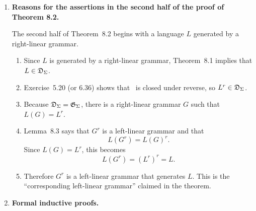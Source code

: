 \begin{enumerate}[{8.}1. ]
\begin{enumerate}
\item Proof by induction on $n$.

\textbf{Base} ($n=0$): A zero-step derivation has the form $A\DRightarrow^0 A$,
so $B=A$ and $x=\lambda$.  Then also
\[
A\DRightarrow_{G^r}^0\lambda^rA=A.
\]

\textbf{Step}: Assume the statement true for $n$ productions.  Suppose
\[
A\DRightarrow_G^{ n+1}By.
\]
Then the first production used in $G$ has the form
\[
A\to Cz
\]
for some $C\in\Omega\cup\{\lambda\}$ and some $z\in\Sigma^*$, and after that
\[
C\DRightarrow_G^{ n}Bx
\]
with $y=zx$.  By the induction hypothesis,
\[
C\DRightarrow_{G^r}^{ n}x^rB.
\]
Since $G^r$ contains the reversed production
\[
A\to z^rC,
\]
we obtain
\[
A\Rightarrow_{G^r} z^rC \DRightarrow_{G^r}^{ n} z^r x^r B = (xz)^r B = y^r B.
\]
The converse implication is identical with the roles of $G$ and $G^r$
reversed.  Therefore the statement holds for all $n$.  In particular,
terminal derivations are reversed, so
\[
L(G^r)=L(G)^r.
\]
\qed
\end{enumerate}

\item \textbf{Reasons for the assertions in the second half of the proof of Theorem 8.2.}

The second half of Theorem~8.2 begins with a language $L$ generated by a
right-linear grammar.

\begin{enumerate}
\item Since $L$ is generated by a right-linear grammar, Theorem~8.1 implies
that $L\in\mathfrak{D}_\Sigma$.

\item Exercise~5.20 (or 6.36) shows that \DSIG\ is closed under reverse, so
$L^r\in\mathfrak{D}_\Sigma$.

\item Because $\mathfrak{D}_\Sigma=\mathfrak{G}_\Sigma$, there is a right-linear grammar $G$ such that
$L(G)=L^r$.

\item Lemma~8.3 says that $G^r$ is a left-linear grammar and that
\[
L(G^r)=L(G)^r.
\]
Since $L(G)=L^r$, this becomes
\[
L(G^r)=(L^r)^r=L.
\]

\item Therefore $G^r$ is a left-linear grammar that generates $L$.  This is the
``corresponding left-linear grammar'' claimed in the theorem.
\end{enumerate}

\item \textbf{Formal inductive proofs.}


\end{enumerate}
